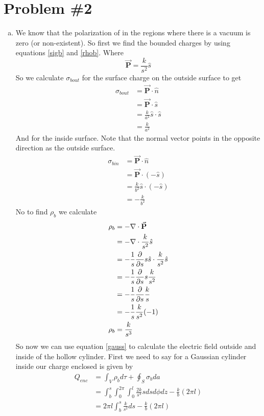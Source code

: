\documentclass[11pt]{article}
\numberwithin{equation}{section}
\newcommand{\grad}{\bold\nabla}
\newcommand{\vecP}{\vec{\mathbf{P}}}
\begin{document}
\section{Problem \#2}
\begin{enumerate}[(a)]
\item
We know that the polarization of in the regions where there is a vacuum is zero (or non-existent). So first we find the bounded charges by using equations \ref{sigb} and \ref{rhob}. Where 
$$\vecP = \frac{k}{s^2}\hat{s}$$
So we calculate $\sigma_{bout}$ for the surface charge on the outside surface to get
\begin{align*}
\sigma_{bout} &= \vecP\cdot\hat{n} \\
&= \vecP\cdot\hat{s} \\
&= \frac{k}{a^2}\hat{s}\cdot\hat{s} \\
&= \frac{k}{a^2}
\end{align*}
And for the inside surface. Note that the normal vector points in the opposite direction as the outside surface.
\begin{align*}
\sigma_{bin} &= \vecP\cdot\hat{n} \\
&= \vecP\cdot(-\hat{s}) \\
&= \frac{k}{b^2}\hat{s}\cdot(-\hat{s}) \\
&= -\frac{k}{b^2}
\end{align*}
No to find $\rho_b$ we calculate
\begin{align*}
\rho_b &= -\grad\cdot\vecP \\
&= -\grad\cdot\frac{k}{s^2}\hat{s} \\
&= -\frac{1}{s}\frac{\partial}{\partial s}s\hat{s}\cdot\frac{k}{s^2}\hat{s} \\
&= -\frac{1}{s}\frac{\partial}{\partial s}s\frac{k}{s^2} \\
&= -\frac{1}{s}\frac{\partial}{\partial s}\frac{k}{s} \\
&= -\frac{1}{s}\frac{k}{s^2}(-1) \\
\rho_b &= \frac{k}{s^3} 
\end{align*}
So now we can use equation \ref{gauss} to calculate the electric field outside and inside of the hollow cylinder. First we need to say for a Gaussian cylinder inside our charge enclosed is given by
\begin{align*}
Q_{enc} &= \int_V\rho_bd\tau + \oint_S\sigma_bda\\
&= \int_b^s\int_0^{2\pi}\int_0^l\frac{2k}{s^3}sdsd\phi dz - \frac{k}{b}(2\pi l)\\
&= 2\pi l\int_b^s\frac{k}{s^2}ds - \frac{k}{b}(2\pi l)\\

\end{align*}
\end{enumerate}
\end{document}
